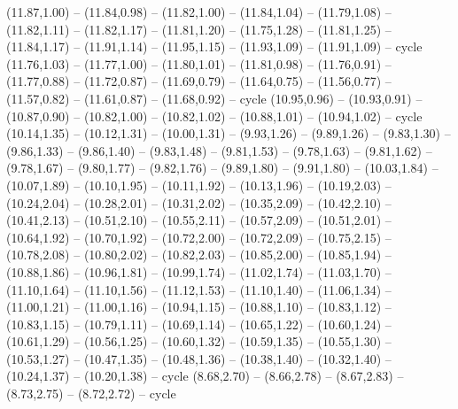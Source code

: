 \expandafter\def\csname geo:gebiet:NCL\endcsname{
  }
\expandafter\def\csname geo:gebiet:SLB\endcsname{
  }
\expandafter\def\csname geo:gebiet:NZL\endcsname{
  (11.87,1.00) -- (11.84,0.98) -- (11.82,1.00) -- (11.84,1.04) -- (11.79,1.08) -- (11.82,1.11) -- (11.82,1.17) -- (11.81,1.20) -- (11.75,1.28) -- (11.81,1.25) -- (11.84,1.17) -- (11.91,1.14) -- (11.95,1.15) -- (11.93,1.09) -- (11.91,1.09) -- cycle
  (11.76,1.03) -- (11.77,1.00) -- (11.80,1.01) -- (11.81,0.98) -- (11.76,0.91) -- (11.77,0.88) -- (11.72,0.87) -- (11.69,0.79) -- (11.64,0.75) -- (11.56,0.77) -- (11.57,0.82) -- (11.61,0.87) -- (11.68,0.92) -- cycle}
\expandafter\def\csname geo:gebiet:AUS\endcsname{
  (10.95,0.96) -- (10.93,0.91) -- (10.87,0.90) -- (10.82,1.00) -- (10.82,1.02) -- (10.88,1.01) -- (10.94,1.02) -- cycle
  (10.14,1.35) -- (10.12,1.31) -- (10.00,1.31) -- (9.93,1.26) -- (9.89,1.26) -- (9.83,1.30) -- (9.86,1.33) -- (9.86,1.40) -- (9.83,1.48) -- (9.81,1.53) -- (9.78,1.63) -- (9.81,1.62) -- (9.78,1.67) -- (9.80,1.77) -- (9.82,1.76) -- (9.89,1.80) -- (9.91,1.80) -- (10.03,1.84) -- (10.07,1.89) -- (10.10,1.95) -- (10.11,1.92) -- (10.13,1.96) -- (10.19,2.03) -- (10.24,2.04) -- (10.28,2.01) -- (10.31,2.02) -- (10.35,2.09) -- (10.42,2.10) -- (10.41,2.13) -- (10.51,2.10) -- (10.55,2.11) -- (10.57,2.09) -- (10.51,2.01) -- (10.64,1.92) -- (10.70,1.92) -- (10.72,2.00) -- (10.72,2.09) -- (10.75,2.15) -- (10.78,2.08) -- (10.80,2.02) -- (10.82,2.03) -- (10.85,2.00) -- (10.85,1.94) -- (10.88,1.86) -- (10.96,1.81) -- (10.99,1.74) -- (11.02,1.74) -- (11.03,1.70) -- (11.10,1.64) -- (11.10,1.56) -- (11.12,1.53) -- (11.10,1.40) -- (11.06,1.34) -- (11.00,1.21) -- (11.00,1.16) -- (10.94,1.15) -- (10.88,1.10) -- (10.83,1.12) -- (10.83,1.15) -- (10.79,1.11) -- (10.69,1.14) -- (10.65,1.22) -- (10.60,1.24) -- (10.61,1.29) -- (10.56,1.25) -- (10.60,1.32) -- (10.59,1.35) -- (10.55,1.30) -- (10.53,1.27) -- (10.47,1.35) -- (10.48,1.36) -- (10.38,1.40) -- (10.32,1.40) -- (10.24,1.37) -- (10.20,1.38) -- cycle}
\expandafter\def\csname geo:gebiet:LKA\endcsname{
  (8.68,2.70) -- (8.66,2.78) -- (8.67,2.83) -- (8.73,2.75) -- (8.72,2.72) -- cycle}
